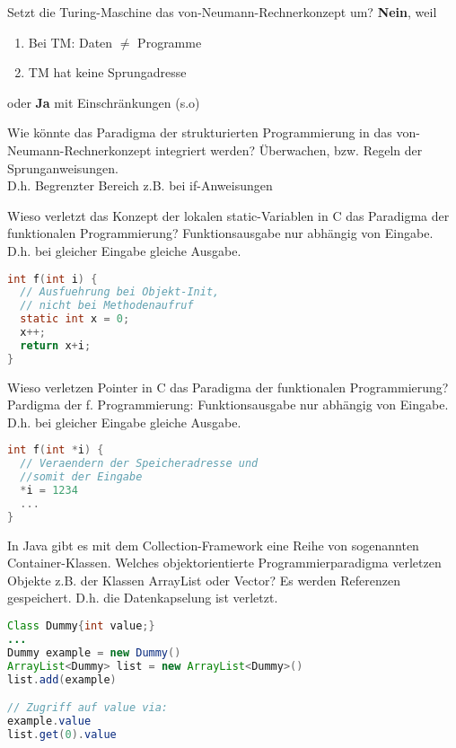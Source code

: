 \begin{card}
	Setzt die Turing-Maschine das von-Neumann-Rechnerkonzept um?
	\hr
	\textbf{Nein}, weil
	\begin{enumerate}
	\item Bei TM: Daten $\neq$ Programme
	\item TM hat keine Sprungadresse
	\end{enumerate}
	oder \textbf{Ja} mit Einschränkungen (s.o)
\end{card}

\begin{card}
	Wie könnte das Paradigma der strukturierten Programmierung in das von-Neumann-Rechnerkonzept integriert werden?
	\hr
	Überwachen, bzw. Regeln der Sprunganweisungen.\\
	D.h. Begrenzter Bereich z.B. bei if-Anweisungen
\end{card}

\begin{card}
	Wieso verletzt das Konzept der lokalen static-Variablen in C das Paradigma der funktionalen
	Programmierung?
	\hr
	Funktionsausgabe nur abhängig von Eingabe. D.h. bei gleicher Eingabe gleiche Ausgabe.
	\begin{lstlisting}[language=C]
int f(int i) {
  // Ausfuehrung bei Objekt-Init, 
  // nicht bei Methodenaufruf
  static int x = 0; 
  x++;
  return x+i;
}
	\end{lstlisting}	
\end{card}

\begin{card}
	Wieso verletzen Pointer in C das Paradigma der funktionalen Programmierung?
	\hr
	Pardigma der f. Programmierung: Funktionsausgabe nur abhängig von Eingabe.  D.h. bei gleicher Eingabe gleiche Ausgabe.
	\begin{lstlisting}[language=C]
int f(int *i) {
  // Veraendern der Speicheradresse und 
  //somit der Eingabe
  *i = 1234
  ...
}
	\end{lstlisting}	
\end{card}

\begin{card}
	In Java gibt es mit dem Collection-Framework eine Reihe von sogenannten Container-Klassen. Welches objektorientierte Programmierparadigma verletzen Objekte z.B. der Klassen	ArrayList oder Vector? 
	\hr
	Es werden Referenzen gespeichert. D.h. die Datenkapselung ist verletzt.
	\begin{lstlisting}[language=Java]
Class Dummy{int value;}
...
Dummy example = new Dummy()
ArrayList<Dummy> list = new ArrayList<Dummy>()
list.add(example)

// Zugriff auf value via:
example.value
list.get(0).value
	\end{lstlisting}	
\end{card}

